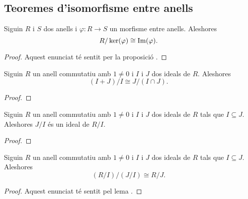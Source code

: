 \documentclass[../Apunts.tex]{subfiles}
\begin{document}
	\subsection{Teoremes d'isomorfisme entre anells} %
	\begin{theorem}
		\label{thm:Primer Teorema de l'isomorfisme entre anells}
		Siguin \(R\) i \(S\) dos anells i \(\varphi\colon R\longrightarrow S\) un morfisme entre anells. Aleshores
		\[R/\operatorname{ker}(\varphi)\cong\operatorname{Im}(\varphi).\]
		\begin{proof}
			Aquest enunciat té sentit per la proposició . %
		\end{proof}
	\end{theorem}
	\begin{theorem}
		\label{thm:Segon Teorema de l'isomorfisme entre anells}
		Siguin \(R\) un anell commutatiu amb \(1\neq0\) i \(I\) i \(J\) dos ideals de \(R\). Aleshores
		\[(I+J)/I\cong J/(I\cap J).\]
		\begin{proof}
		\end{proof}
	\end{theorem}
	\begin{lemma}
		\label{lema:Tercer Teorema de l'isomorfisme entre anells}
		Siguin \(R\) un anell commutatiu amb \(1\neq0\) i \(I\) i \(J\) dos ideals de \(R\) tals que \(I\subseteq J\). Aleshores \(J/I\) és un ideal de \(R/I\). %
		\begin{proof}
		\end{proof}
	\end{lemma}
	\begin{theorem}
		\label{thm:Tercer Teorema de l'isomorfisme entre anells}
		Siguin \(R\) un anell commutatiu amb \(1\neq0\) i \(I\) i \(J\) dos ideals de \(R\) tals que \(I\subseteq J\). Aleshores
		\[(R/I)/(J/I)\cong R/J.\]
		\begin{proof}
			Aquest enunciat té sentit pel lema . %
		\end{proof}
	\end{theorem}
\end{document}
